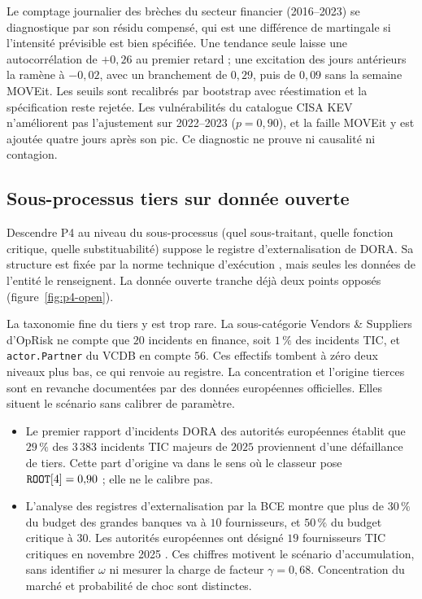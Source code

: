 Le comptage journalier des brèches du secteur financier (2016--2023) se diagnostique par son
résidu compensé, qui est une différence de martingale si l'intensité prévisible est bien spécifiée.
Une tendance seule laisse une autocorrélation de $+0{,}26$ au premier retard ; une excitation des jours
antérieurs la ramène à $-0{,}02$, avec un branchement de $0{,}29$, puis de $0{,}09$ sans la semaine MOVEit.
Les seuils sont recalibrés par bootstrap avec réestimation et la spécification reste rejetée. Les
vulnérabilités du catalogue CISA KEV n'améliorent pas l'ajustement sur 2022--2023 ($p=0{,}90$), et la
faille MOVEit y est ajoutée quatre jours après son pic. Ce diagnostic ne prouve ni causalité ni contagion.

\subsection{Sous-processus tiers sur donnée ouverte}
\label{sec:p4-sousprocess}

Descendre P4 au niveau du sous-processus (quel sous-traitant, quelle fonction critique, quelle
substituabilité) suppose le registre d'externalisation de DORA. Sa structure est fixée par la norme
technique d'exécution \citep{eu2024_2956}, mais seules les données de l'entité le renseignent. La
donnée ouverte tranche déjà deux points opposés (figure~\ref{fig:p4-open}).

La taxonomie fine du tiers y est trop rare. La sous-catégorie \og Vendors \& Suppliers \fg{} d'OpRisk
ne compte que $20$ incidents en finance, soit $1\,\%$ des incidents TIC, et \texttt{actor.Partner} du
VCDB en compte $56$. Ces effectifs tombent à zéro deux niveaux plus bas, ce qui renvoie au registre.
La concentration et l'origine tierces sont en revanche documentées par des données européennes
officielles. Elles situent le scénario sans calibrer de paramètre.
\begin{itemize}\itemsep2pt
\item Le premier rapport d'incidents DORA des autorités européennes \citep{esas2026_incidents}
      établit que $29\,\%$ des $3\,383$ incidents TIC majeurs de $2025$ proviennent d'une défaillance
      de tiers. Cette part d'origine va dans le sens où le classeur pose
      $\text{\texttt{ROOT}}[4]=0{,}90$ ; elle ne le calibre pas.
\item L'analyse des registres d'externalisation par la BCE \citep{ecb2024_outsourcing} montre que plus
      de $30\,\%$ du budget des grandes banques va à $10$ fournisseurs, et $50\,\%$ du budget critique
      à $30$. Les autorités européennes ont désigné $19$ fournisseurs TIC critiques en novembre 2025
      \citep{esas2025_ctpp}. Ces chiffres motivent le scénario d'accumulation, sans identifier $\omega$ ni mesurer la
charge de facteur $\gamma=0{,}68$. Concentration du marché et probabilité de choc sont distinctes.
\end{itemize}

